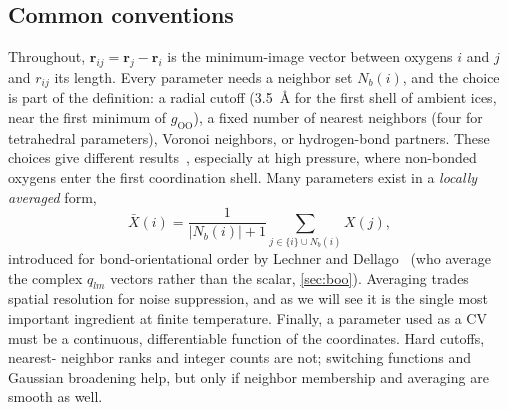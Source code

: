 \documentclass[11pt,a4paper]{article}
\begin{document}
\subsection{Common conventions}
Throughout, $\mathbf r_{ij}=\mathbf r_j-\mathbf r_i$ is the minimum-image
vector between oxygens $i$ and $j$ and $r_{ij}$ its length. Every parameter
needs a neighbor set $N_b(i)$, and the choice is part of the definition:
a radial cutoff (3.5~\AA{} for the first shell of ambient ices, near the first
minimum of $g_{\mathrm{OO}}$), a fixed number of nearest neighbors (four for
tetrahedral parameters), Voronoi neighbors, or hydrogen-bond partners. These
choices give different results~\cite{Mickel2013}, especially at high pressure,
where non-bonded oxygens enter the first coordination shell.
Many parameters exist in a \emph{locally averaged} form,
\begin{equation}
  \bar X(i) = \frac{1}{|N_b(i)|+1} \sum_{j\in\{i\}\cup N_b(i)} X(j),
\end{equation}
introduced for bond-orientational order by Lechner and
Dellago~\cite{Lechner2008} (who average the complex $q_{lm}$ vectors rather
than the scalar, \cref{sec:boo}). Averaging trades spatial resolution for
noise suppression, and as we will see it is the single most important
ingredient at finite temperature. Finally, a parameter used as a CV must be a
continuous, differentiable function of the coordinates. Hard cutoffs, nearest-
neighbor ranks and integer counts are not; switching functions and Gaussian
broadening help, but only if neighbor membership and averaging are smooth
as well.
\end{document}
